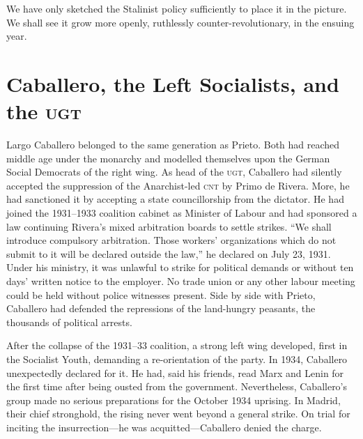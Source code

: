 We have only sketched the Stalinist policy sufficiently to place it in the picture. We shall see it grow more openly, ruthlessly counter-revolutionary, in the ensuing year.

\section{Caballero, the Left Socialists, and the \textsc{ugt}}

Largo Caballero belonged to the same generation as Prieto. Both had reached middle age under the monarchy and modelled themselves upon the German Social Democrats of the right wing. As head of the \textsc{ugt}, Caballero had silently accepted the suppression of the Anarchist-led \textsc{cnt} by Primo de Rivera. More, he had sanctioned it by accepting a state councillorship from the dictator. He had joined the 1931–1933 coalition cabinet as Minister of Labour and had sponsored a law continuing Rivera’s mixed arbitration boards to settle strikes. ``We shall introduce compulsory arbitration. Those workers’ organizations which do not submit to it will be declared outside the law,'' he declared on July 23, 1931. Under his ministry, it was unlawful to strike for political demands or without ten days’ written notice to the employer. No trade union or any other labour meeting could be held without police witnesses present. Side by side with Prieto, Caballero had defended the repressions of the land-hungry peasants, the thousands of political arrests.

After the collapse of the 1931–33 coalition, a strong left wing developed, first in the Socialist Youth, demanding a re-orientation of the party. In 1934, Caballero unexpectedly declared for it. He had, said his friends, read Marx and Lenin for the first time after being ousted from the government. Nevertheless, Caballero’s group made no serious preparations for the October 1934 uprising. In Madrid, their chief stronghold, the rising never went beyond a general strike. On trial for inciting the insurrection---he was acquitted---Caballero denied the charge.

